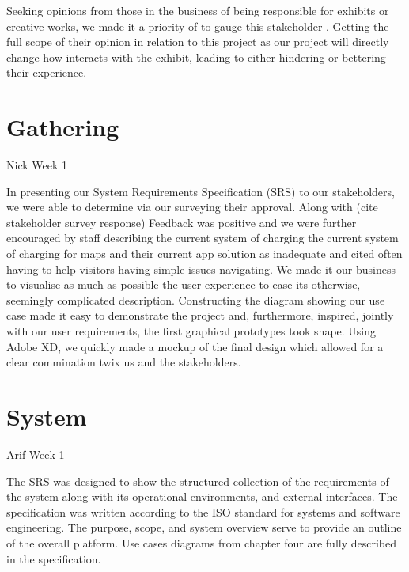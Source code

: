 Seeking opinions from those in the business of being responsible for exhibits or creative works, we made it a priority of to gauge this stakeholder . Getting the full scope of their opinion in relation to this project as our project will directly change how  interacts with the exhibit, leading to either hindering or bettering their experience. 



\section{Gathering}
Nick Week 1

In presenting our System Requirements Specification (SRS) to our stakeholders, we were able to determine via our surveying their approval. Along with (cite stakeholder survey response) Feedback was positive and we were further encouraged by staff describing the current system of charging the current system of charging for maps and their current app solution as inadequate and cited often having to help visitors having simple issues navigating. We made it our business to visualise as much as possible the user experience to ease its otherwise, seemingly complicated description. Constructing the diagram showing our use case made it easy to demonstrate the project and, furthermore, inspired, jointly with our user requirements, the first graphical prototypes took shape. Using Adobe XD, we quickly made a mockup of the final design which allowed for a clear commination twix us and the stakeholders. 


\section{System}
Arif Week 1

The SRS was designed to show the structured collection of the requirements of the system along with its operational environments, and external interfaces. The specification was written according to the ISO standard for systems and software engineering. The purpose, scope, and system overview serve to provide an outline of the overall platform. Use cases diagrams from chapter four are fully described in the specification.


